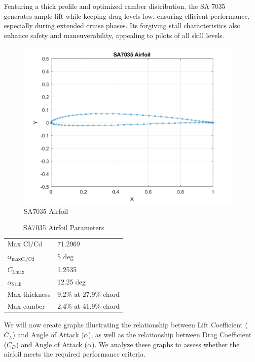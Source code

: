 \documentclass[12 pt]{article}
\begin{document}
Featuring a thick profile and optimized camber distribution, the SA 7035 generates ample lift while keeping drag levels low, ensuring efficient performance, especially during extended cruise phases. Its forgiving stall characteristics also enhance safety and maneuverability, appealing to pilots of all skill levels.
\begin{figure}[h]
    \centering
    \includegraphics[width = 0.85\linewidth]{Codes/Week 6/Airfoil.png}
    \caption{SA7035 Airfoil}
    \label{fig:enter-label}
    \end{figure}
\begin{table}[h]
\centering
\caption{SA7035 Airfoil Parameters}
\begin{tabular}{ll}
\hline
Max Cl/Cd & 71.2969 \\
$\alpha_{\text{maxCl/Cd}}$ & 5 deg \\
$C_{\text{Lmax}}$ & 1.2535 \\
$\alpha_{\text{Stall}}$ & 12.25 deg \\
Max thickness & 9.2\% at 27.9\% chord \\
Max camber & 2.4\% at 41.9\% chord \\
\hline
\end{tabular}
\end{table}
\newpage
We will now create graphs illustrating the relationship between Lift Coefficient ($C_L$) and Angle of Attack ($\alpha$), as well as the relationship between Drag Coefficient ($C_D$) and Angle of Attack ($\alpha$). We analyze these graphs to assess whether the airfoil meets the required performance criteria.
\newpage
\end{document}
